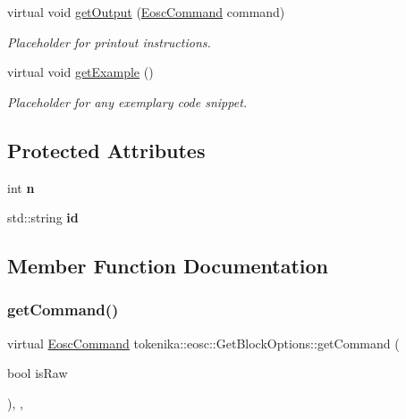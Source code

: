 \begin{DoxyCompactItemize}
virtual void \hyperlink{classtokenika_1_1eosc_1_1_get_block_options_a8d45be43c2a93468910db4533db832cc}{get\+Output} (\hyperlink{classtokenika_1_1eosc_1_1_eosc_command}{Eosc\+Command} command)
\begin{DoxyCompactList}\small\item\em Placeholder for printout instructions. \end{DoxyCompactList}\item 
virtual void \hyperlink{classtokenika_1_1eosc_1_1_get_block_options_ace1d886b5fb260150df8d291339fbd03}{get\+Example} ()
\begin{DoxyCompactList}\small\item\em Placeholder for any exemplary code snippet. \end{DoxyCompactList}\end{DoxyCompactItemize}
\subsection*{Protected Attributes}
\begin{DoxyCompactItemize}
\item 
\mbox{\label{classtokenika_1_1eosc_1_1_get_block_options_af6c20effd6a52b8d26a8377450585142}} 
int {\bfseries n}
\item 
\mbox{\label{classtokenika_1_1eosc_1_1_get_block_options_a0eda5e812218067adfc5bbab2d6b4048}} 
std\+::string {\bfseries id}
\end{DoxyCompactItemize}


\subsection{Member Function Documentation}
\mbox{\label{classtokenika_1_1eosc_1_1_get_block_options_ac1c5b62f162c4253cab8de5a93fe5cf9}} 
\subsubsection{\texorpdfstring{get\+Command()}{getCommand()}}
{\footnotesize\ttfamily virtual \hyperlink{classtokenika_1_1eosc_1_1_eosc_command}{Eosc\+Command} tokenika\+::eosc\+::\+Get\+Block\+Options\+::get\+Command (\begin{DoxyParamCaption}\item[{bool}]{is\+Raw }\end{DoxyParamCaption})\hspace{0.3cm}{\ttfamily [inline]}, {\ttfamily [protected]}, {\ttfamily [virtual]}}




